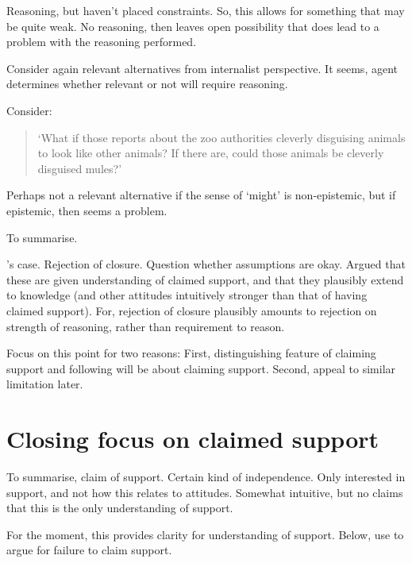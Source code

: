 \begin{note}
  Reasoning, but haven't placed constraints.
  So, this allows for something that may be quite weak.
  No reasoning, then leaves open possibility that does lead to a problem with the reasoning performed.

  Consider again relevant alternatives from internalist perspective.
  It seems, agent determines whether relevant or not will require reasoning.

  Consider:
  \begin{quote}
    `What if those reports about the zoo authorities cleverly disguising animals to look like other animals?
    If there are, could those animals be cleverly disguised mules?'
  \end{quote}
  Perhaps not a relevant alternative if the sense of `might' is non-epistemic, but if epistemic, then seems a problem.
\end{note}

\begin{note}
  To summarise.

  \citeauthor{Dretske:1970to}'s case.
  Rejection of closure.
  Question whether assumptions are okay.
  Argued that these are given understanding of claimed support, and that they plausibly extend to knowledge (and other attitudes intuitively stronger than that of having claimed support).
  For, rejection of closure plausibly amounts to rejection on strength of reasoning, rather than requirement to reason.

  Focus on this point for two reasons:
  First, distinguishing feature of claiming support and following will be about claiming support.
  Second, appeal to similar limitation later.
\end{note}

\section{Closing focus on claimed support}

\begin{note}
  To summarise, claim of support.
  Certain kind of independence.
  Only interested in support, and not how this relates to attitudes.
  Somewhat intuitive, but no claims that this is the only understanding of support.

  For the moment, this provides clarity for understanding of support.
  Below, use to argue for failure to claim support.
\end{note}


